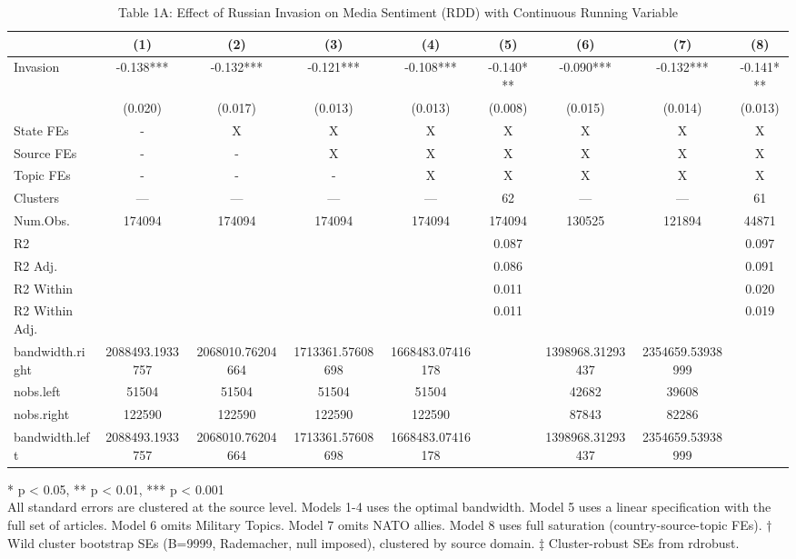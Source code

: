 \begin{table}[t]
\caption{\label{tab:table1a}Table 1A: Effect of Russian Invasion on Media Sentiment (RDD) with Continuous Running Variable} 
\fontsize{12.0pt}{14.0pt}\selectfont
\begin{tabular*}{\linewidth}{@{\extracolsep{\fill}}lcccccccc}
\toprule
  & (1) & (2) & (3) & (4) & (5) & (6) & (7) & (8) \\ 
\midrule\addlinespace[2.5pt]
Invasion & -0.138*** & -0.132*** & -0.121*** & -0.108*** & -0.140*** & -0.090*** & -0.132*** & -0.141*** \\ 
{} & {(0.020)} & {(0.017)} & {(0.013)} & {(0.013)} & {(0.008)} & {(0.015)} & {(0.014)} & {(0.013)} \\ 
State FEs & - & X & X & X & X & X & X & X \\ 
Source FEs & - & - & X & X & X & X & X & X \\ 
Topic FEs & - & - & - & X & X & X & X & X \\ 
Clusters & — & — & — & — & 62 & — & — & 61 \\ 
Num.Obs. & 174094 & 174094 & 174094 & 174094 & 174094 & 130525 & 121894 & 44871 \\ 
R2 &  &  &  &  & 0.087 &  &  & 0.097 \\ 
R2 Adj. &  &  &  &  & 0.086 &  &  & 0.091 \\ 
R2 Within &  &  &  &  & 0.011 &  &  & 0.020 \\ 
R2 Within Adj. &  &  &  &  & 0.011 &  &  & 0.019 \\ 
bandwidth.right & 2088493.1933757 & 2068010.76204664 & 1713361.57608698 & 1668483.07416178 &  & 1398968.31293437 & 2354659.53938999 &  \\ 
nobs.left & 51504 & 51504 & 51504 & 51504 &  & 42682 & 39608 &  \\ 
nobs.right & 122590 & 122590 & 122590 & 122590 &  & 87843 & 82286 &  \\ 
bandwidth.left & 2088493.1933757 & 2068010.76204664 & 1713361.57608698 & 1668483.07416178 &  & 1398968.31293437 & 2354659.53938999 &  \\ 
\bottomrule
\end{tabular*}
\begin{minipage}{\linewidth}
\vspace{.05em}
* p < 0.05, ** p < 0.01, *** p < 0.001\\
All standard errors are clustered at the source level. Models 1-4 uses the
optimal bandwidth. Model 5 uses a linear specification with the full set of
articles. Model 6 omits Military Topics. Model 7 omits NATO allies. Model 8
uses full saturation (country-source-topic FEs). † Wild cluster bootstrap SEs
(B=9999, Rademacher, null imposed), clustered by source domain. ‡ Cluster-robust
SEs from rdrobust.\\
\end{minipage}
\end{table}

